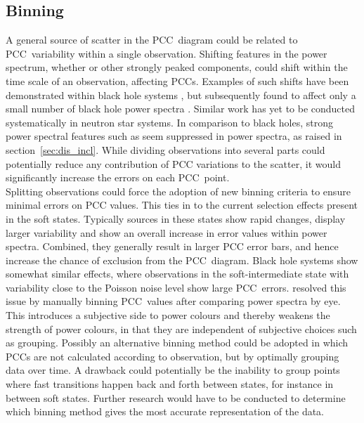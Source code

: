 \subsection{Binning}
\label{sec:binning}
A general source of scatter in the \ac{PCC}~diagram could be related to \ac{PCC}~variability within a single observation. Shifting features in the power spectrum, whether \QPOs or other strongly peaked components, could shift within the time scale of an observation, affecting \acp{PCC}. Examples of such shifts have been demonstrated within black hole systems \citep[e.g.][]{motta2012discovery}, but subsequently found to affect only a small number of black hole power spectra \citep{heil2012ubiquity}. Similar work has yet to be conducted systematically in neutron star systems. In comparison to black holes, strong power spectral features such as \QPOs seem suppressed in power spectra, as raised in section~\ref{sec:dis_incl}. While dividing observations into several parts could potentially reduce any contribution of \ac{PCC} variations to the scatter, it would significantly increase the errors on each \ac{PCC}~point. \\

Splitting observations could force the adoption of new binning criteria to ensure minimal errors on \ac{PCC} values. This ties in to the current selection effects present in the soft states. Typically sources in these states show rapid changes, display larger variability and show an overall increase in error values within power spectra. Combined, they generally result in larger \ac{PCC} error bars, and hence increase the chance of exclusion from the \ac{PCC}~diagram. Black hole systems show somewhat similar effects, where observations in the soft-intermediate state with variability close to the Poisson noise level show large \ac{PCC}~errors. \citet{heil2015power} resolved this issue by manually binning \ac{PCC}~values after comparing power spectra by eye. This introduces a subjective side to power colours and thereby weakens the strength of power colours, in that they are independent of subjective choices such as grouping. Possibly an alternative binning method could be adopted in which \acp{PCC} are not calculated according to observation, but by optimally grouping data over time. A drawback could potentially be the inability to group points where fast transitions happen back and forth between states, for instance in between soft states. Further research would have to be conducted to determine which binning method gives the most accurate representation of the data.\\

